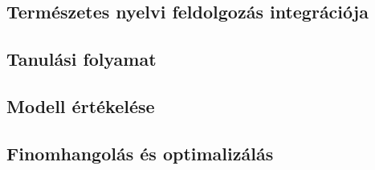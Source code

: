 \subsection{Természetes nyelvi feldolgozás integrációja}

\subsection{Tanulási folyamat}

\subsection{Modell értékelése}

\subsection{Finomhangolás és optimalizálás}